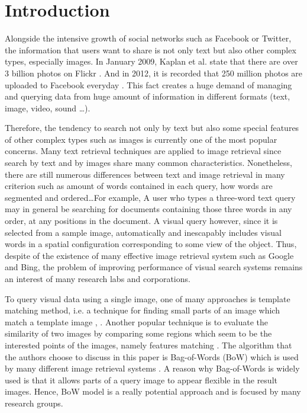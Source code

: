 % 

\section{Introduction} \label{section:introduction}
Alongside the intensive growth of social networks such as Facebook or Twitter, the information that users want to share is not only text but also other complex types, especially images. In January 2009, Kaplan et al. state that there are over 3 billion photos on Flickr \cite{Kaplan201059}. And in 2012, it is recorded that 250 million photos are uploaded to Facebook everyday \cite{1}. This fact creates a huge demand of managing and querying data from huge amount of information in different formats (text, image, video, sound \ldots).

Therefore, the tendency to search not only by text but also some special features of other complex types such as images is currently one of the most popular concerns. Many text retrieval techniques are applied to image retrieval since search by text and by images share many common characteristics. Nonetheless, there are still numerous differences between text and image retrieval in many criterion such as amount of words contained in each query, how words are segmented and ordered\ldots For example, A user who types a three-word text query may in general be searching for documents containing those three words in any order, at any positions in the document. A visual query however, since it is selected
from a sample image, automatically and inescapably includes visual words in a spatial configuration corresponding to some view of the object. Thus, despite of the existence of many effective image retrieval system such as Google and Bing, the problem of improving performance of visual search systems remains an interest of many research labs and corporations.

To query visual data using a single image, one of many approaches is template matching method, i.e. a technique for finding small parts of an image which match a template image \cite{brunelli_template_matching}, \cite{Rosenfeld4309663, Gharavi913587}. Another popular technique is to evaluate the similarity of two images by comparing some regions which seem to be the interested points of the images, namely features matching \cite{Belongie710790, Rubner, Viola990517}. The algorithm that the authors choose to discuss in this paper is Bag-of-Words (BoW) \cite{3} which is used by many different image retrieval systems \cite{3, 2, 7}. A reason why Bag-of-Words is widely used is that it allows parts of a query image to appear flexible in the result images. Hence, BoW model is a really potential approach and is focused by many research groups.


